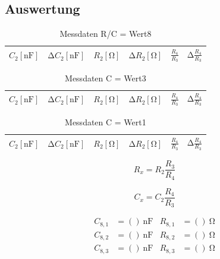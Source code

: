\subsection{Auswertung}
\begin{table}
  \centering
  \caption{Messdaten R/C = Wert8}
  \label{tab:3}
  \begin{tabular}{c c c c c c}
    \toprule
    {$C_2 [\si{\nano\farad}]$} & {$\increment C_2 [\si{\nano\farad}]$} & {$R_2 [\si{\ohm}]$} & {$\increment R_2 [\si{\ohm}]$} & {$\frac{R_4}{R_3}$} & {$\increment \frac{R_4}{R_3}$} \\
    \midrule
    
    \bottomrule
  \end{tabular}
\end{table}
\begin{table}
  \centering
  \caption{Messdaten C = Wert3}
  \label{tab:4}
  \begin{tabular}{c c c c c c}
    \toprule
    {$C_2 [\si{\nano\farad}]$} & {$\increment C_2 [\si{\nano\farad}]$} & {$R_2 [\si{\ohm}]$} & {$\increment R_2 [\si{\ohm}]$} & {$\frac{R_4}{R_3}$} & {$\increment \frac{R_4}{R_3}$} \\
    \midrule
    
    \bottomrule
  \end{tabular}
\end{table}
\begin{table}
  \centering
  \caption{Messdaten C = Wert1}
  \label{tab:5}
  \begin{tabular}{c c c c c c}
    \toprule
    {$C_2 [\si{\nano\farad}]$} & {$\increment C_2 [\si{\nano\farad}]$} & {$R_2 [\si{\ohm}]$} & {$\increment R_2 [\si{\ohm}]$} & {$\frac{R_4}{R_3}$} & {$\increment \frac{R_4}{R_3}$} \\
    \midrule
    
    \bottomrule
  \end{tabular}
\end{table}

\begin{equation}
  R_x = R_2 \frac{R_3}{R_4}
\end{equation}

\begin{equation}
  C_x = C_2 \frac{R_4}{R_3}
\end{equation}

\begin{align}
  C_{8,1}   &= ()\:\si{\nano\farad} & R_{8,1} &= ()\:\si{\ohm}\\
  C_{8,2}   &= ()\:\si{\nano\farad} & R_{8,2} &= ()\:\si{\ohm}\\
  C_{8,3}   &= ()\:\si{\nano\farad} & R_{8,3} &= ()\:\si{\ohm}
\end{align}

